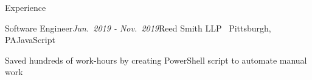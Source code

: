 \documentclass{resume} %
\begin{document}
\begin{rSection}{Experience}

  \begin{rSubsection}{Software Engineer}{\em Jun.\ 2019 - Nov.\ 2019}{Reed Smith LLP \textbar \ Pittsburgh, PA}{JavaScript}
 \item Saved hundreds of work-hours by creating PowerShell script to automate manual work
 \end{rSubsection}








\end{rSection}

\end{document}
